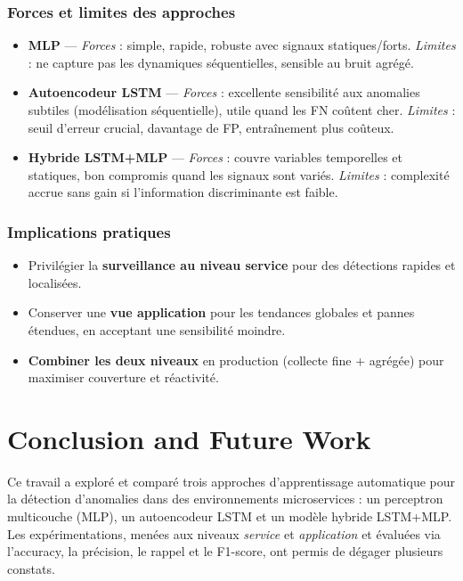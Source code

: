 \documentclass[conference]{IEEEtran}
\begin{document}
\subsubsection*{Forces et limites des approches}

\begin{itemize}
  \item \textbf{MLP} — \emph{Forces} : simple, rapide, robuste avec signaux statiques/forts. \emph{Limites} : ne capture pas les dynamiques séquentielles, sensible au bruit agrégé.
  \item \textbf{Autoencodeur LSTM} — \emph{Forces} : excellente sensibilité aux anomalies subtiles (modélisation séquentielle), utile quand les FN coûtent cher. \emph{Limites} : seuil d’erreur crucial, davantage de FP, entraînement plus coûteux.
  \item \textbf{Hybride LSTM+MLP} — \emph{Forces} : couvre variables temporelles et statiques, bon compromis quand les signaux sont variés. \emph{Limites} : complexité accrue sans gain si l’information discriminante est faible.
\end{itemize}

\subsubsection*{Implications pratiques}

\begin{itemize}
  \item Privilégier la \textbf{surveillance au niveau service} pour des détections rapides et localisées.
  \item Conserver une \textbf{vue application} pour les tendances globales et pannes étendues, en acceptant une sensibilité moindre.
  \item \textbf{Combiner les deux niveaux} en production (collecte fine + agrégée) pour maximiser couverture et réactivité.
\end{itemize}



\section{Conclusion and Future Work}

Ce travail a exploré et comparé trois approches d'apprentissage automatique pour la détection d'anomalies dans des environnements microservices : un perceptron multicouche (MLP), un autoencodeur LSTM et un modèle hybride LSTM+MLP. Les expérimentations, menées aux niveaux \textit{service} et \textit{application} et évaluées via l’accuracy, la précision, le rappel et le F1-score, ont permis de dégager plusieurs constats.
\end{document}
